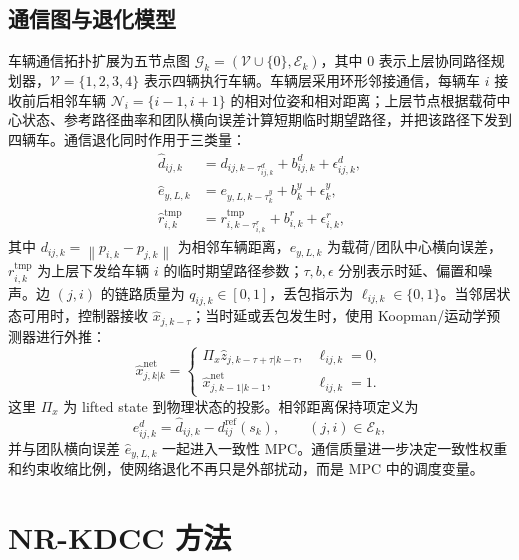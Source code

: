 \documentclass[twocolumn,3p,times,procedia]{elsarticle}
\newcommand{\Method}{NR-KDCC}
\newcommand{\norm}[1]{\left\lVert #1 \right\rVert}
\begin{document}
\subsection{通信图与退化模型}

车辆通信拓扑扩展为五节点图 $\mathcal G_k=(\mathcal V\cup\{0\},\mathcal E_k)$，其中 $0$ 表示上层协同路径规划器，$\mathcal V=\{1,2,3,4\}$ 表示四辆执行车辆。车辆层采用环形邻接通信，每辆车 $i$ 接收前后相邻车辆 $\mathcal N_i=\{i-1,i+1\}$ 的相对位姿和相对距离；上层节点根据载荷中心状态、参考路径曲率和团队横向误差计算短期临时期望路径，并把该路径下发到四辆车。通信退化同时作用于三类量：
\begin{equation}
\begin{aligned}
\hat d_{ij,k}&=d_{ij,k-\tau^d_{ij,k}}+b^d_{ij,k}+\epsilon^d_{ij,k},\\
\hat e_{y,L,k}&=e_{y,L,k-\tau^y_k}+b^y_k+\epsilon^y_k,\\
\hat r_{i,k}^{\mathrm{tmp}}&=r_{i,k-\tau^r_{i,k}}^{\mathrm{tmp}}+b^r_{i,k}+\epsilon^r_{i,k},
\end{aligned}
\label{eq:comm_corrupted_measurements}
\end{equation}
其中 $d_{ij,k}=\norm{p_{i,k}-p_{j,k}}$ 为相邻车辆距离，$e_{y,L,k}$ 为载荷/团队中心横向误差，$r_{i,k}^{\mathrm{tmp}}$ 为上层下发给车辆 $i$ 的临时期望路径参数；$\tau,b,\epsilon$ 分别表示时延、偏置和噪声。边 $(j,i)$ 的链路质量为 $q_{ij,k}\in[0,1]$，丢包指示为 $\ell_{ij,k}\in\{0,1\}$。当邻居状态可用时，控制器接收 $\hat x_{j,k-\tau}$；当时延或丢包发生时，使用 Koopman/运动学预测器进行外推：
\begin{equation}
\hat x_{j,k|k}^{\mathrm{net}}=
\begin{cases}
\Pi_x \hat z_{j,k-\tau+\tau|k-\tau}, & \ell_{ij,k}=0,\\
\hat x_{j,k-1|k-1}^{\mathrm{net}}, & \ell_{ij,k}=1 .
\end{cases}
\label{eq:delay_prediction}
\end{equation}
这里 $\Pi_x$ 为 lifted state 到物理状态的投影。相邻距离保持项定义为
\begin{equation}
e^{d}_{ij,k}=\hat d_{ij,k}-d^{\mathrm{ref}}_{ij}(s_k),\qquad (j,i)\in\mathcal E_k ,
\label{eq:adjacent_distance_error}
\end{equation}
并与团队横向误差 $\hat e_{y,L,k}$ 一起进入一致性 MPC。通信质量进一步决定一致性权重和约束收缩比例，使网络退化不再只是外部扰动，而是 MPC 中的调度变量。

\section{\Method{} 方法}
\end{document}
